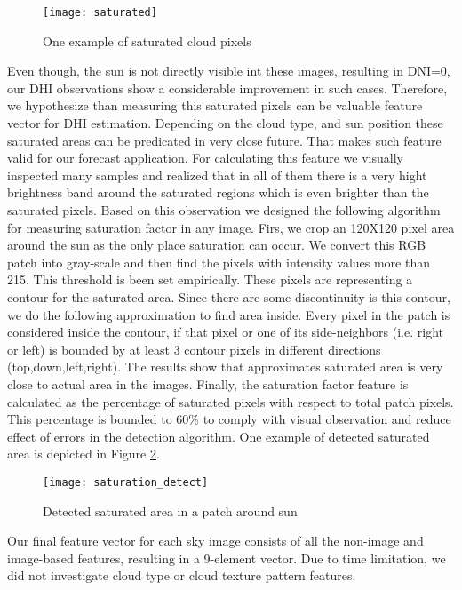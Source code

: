 \begin{figure}[h]
\caption{One example of saturated cloud pixels}
\label{fig:saturated_example}
\texttt{[image: saturated]}
\centering
\end{figure}

Even though, the sun is not directly visible int these images, resulting in DNI=0, our DHI observations show a considerable improvement in such cases. Therefore, we hypothesize than measuring this saturated pixels can be valuable feature vector for DHI estimation. Depending on the cloud type, and sun position these saturated areas can be predicated in very close future. That makes such feature valid for our forecast application. For calculating this feature we visually inspected many samples and realized that in all of them there is a very hight brightness band around the saturated regions which is even brighter than the saturated pixels. Based on this observation we designed the following algorithm for measuring saturation factor in any image. Firs, we crop an 120X120 pixel area around the sun as the only place saturation can occur. We convert this RGB patch into gray-scale and then find the pixels with intensity values more than 215. This threshold is been set empirically. These pixels are representing a contour for the saturated area. Since there are some discontinuity is this contour, we do the following approximation to find area inside. Every pixel in the patch is considered inside the contour, if that pixel or one of its side-neighbors (i.e. right or left) is bounded by at least 3 contour pixels in different directions (top,down,left,right). The results show that approximates saturated area is very close to actual area in the images. Finally, the saturation factor feature is calculated as the percentage of saturated pixels with respect to total patch pixels. This percentage is bounded to 60\% to comply with visual observation and reduce effect of errors in the detection algorithm. One example of detected saturated area is depicted in Figure \ref{fig:saturated_result_example}.

\begin{figure}[h]
\caption{Detected saturated area in a patch around sun}
\label{fig:saturated_result_example}
\texttt{[image: saturation\_detect]}
\centering
\end{figure}

Our final feature vector for each sky image consists of all the non-image and image-based features, resulting in a 9-element vector. Due to time limitation, we did not investigate cloud type or cloud texture pattern features.

